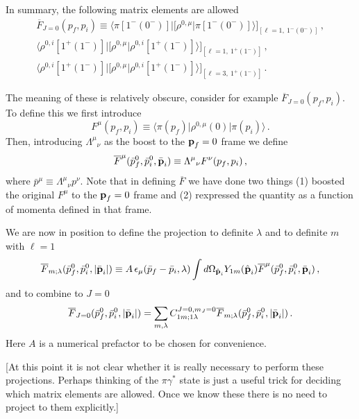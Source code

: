 \bigskip

{\mh In summary, the following matrix elements are allowed
\begin{gather}
\overline F_{J=0}(p_f, p_i) \equiv \big  \langle \pi [1^- (0^-)] \big \vert \Big [ \rho^{0,\mu}  \big \vert \pi [1^- (0^-)] \big \rangle \Big ]_{[\ell=1,\ 1^- (0^-)]}   \,, \\
  \big  \langle \rho^{0,i} [1^+ (1^-)] \big \vert \Big [ \rho^{0,\mu}  \big\vert \rho^{0,i} [1^+ (1^-)]  \big\rangle \Big ]_{[\ell=1,\ 1^+ (1^-)]}   \,, \\
  \big  \langle \rho^{0,i} [1^+ (1^-)] \big \vert \Big [ \rho^{0,\mu} \big \vert \rho^{0,i} [1^+ (1^-)] \big \rangle \Big ]_{[\ell=3,\ 1^+ (1^-)]}   \,.
\end{gather}

The meaning of these is relatively obscure, consider for example $\overline F_{J=0}(p_f, p_i)$. To define this we first introduce
\begin{equation}
F^\mu(p_f, p_i)  \equiv \langle \pi(p_f) \vert \rho^{0, \mu}(0) \vert \pi (p_i) \rangle \,.
\end{equation}
Then, introducing ${\Lambda^\mu}_\nu$ as the boost to the $\textbf p_f=0$ frame we define
\begin{equation}
\overline F^\mu(\bar p_f^0, \bar p_i^0, \bar {\textbf p}_i)  \equiv {\Lambda^\mu}_\nu  F^\nu(p_f, p_i)  \,,
\end{equation}
where $\bar p^\mu \equiv {\Lambda^\mu}_\nu p^\nu$. Note that in defining $\overline F$ we have done two things (1) boosted the original $F^\mu$ to the $\textbf p_f=0$ frame and (2) rexpressed the quantity as a function of momenta defined in that frame.

We are now in position to define the projection to definite $\lambda$ and to definite $m$ with $\ell=1$
\begin{equation}
\overline F_{m; \lambda}(\bar p_f^0, \bar p_i^0, \vert \bar {\textbf p}_i\vert) \equiv A \, \epsilon_\mu(\bar p_f - \bar p_i, \lambda) \int d \Omega_{\hat {\textbf p}_i} Y_{1 m}(\hat {\textbf p}_i) \overline F^\mu(\bar p_f^0, \bar p_i^0, \bar {\textbf p}_i)  \,,
\end{equation}
and to combine to $J=0$
\begin{equation}
\overline F_{J=0}(\bar p_f^0, \bar p_i^0, \vert \bar {\textbf p}_i\vert)  = \sum_{m,\lambda} C^{J=0,m_J=0}_{1 m; 1 \lambda} \overline F_{m; \lambda}(\bar p_f^0, \bar p_i^0, \vert \bar {\textbf p}_i\vert)  \,.
\end{equation}
Here $A$ is a numerical prefactor to be chosen for convenience.

[At this point it is not clear whether it is really necessary to perform these projections. Perhaps thinking of the $\pi \gamma^*$ state is just a useful trick for deciding which matrix elements are allowed. Once we know these there is no need to project to them explicitly.]


}


